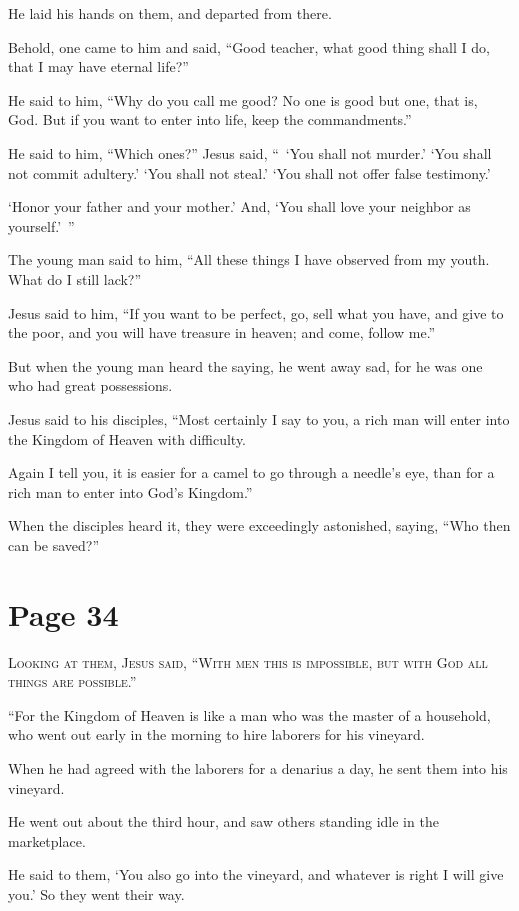 He laid his hands on them, and departed from there.

Behold, one came to him and said, “Good teacher, what good thing shall I do, that I may have eternal life?”

He said to him, “Why do you call me good? No one is good but one, that is, God. But if you want to enter into life, keep the commandments.”

He said to him, “Which ones?” Jesus said, “ ‘You shall not murder.’ ‘You shall not commit adultery.’ ‘You shall not steal.’ ‘You shall not offer false testimony.’

‘Honor your father and your mother.’ And, ‘You shall love your neighbor as yourself.’ ”

The young man said to him, “All these things I have observed from my youth. What do I still lack?”

Jesus said to him, “If you want to be perfect, go, sell what you have, and give to the poor, and you will have treasure in heaven; and come, follow me.”

But when the young man heard the saying, he went away sad, for he was one who had great possessions.

Jesus said to his disciples, “Most certainly I say to you, a rich man will enter into the Kingdom of Heaven with difficulty.

Again I tell you, it is easier for a camel to go through a needle’s eye, than for a rich man to enter into God’s Kingdom.”

When the disciples heard it, they were exceedingly astonished, saying, “Who then can be saved?”



\chapterornament
\section*{Page 34}

\lettrine{L}{ooking at them, Jesus said, “With men this is impossible, but with God all things are possible.”}

“For the Kingdom of Heaven is like a man who was the master of a household, who went out early in the morning to hire laborers for his vineyard.

When he had agreed with the laborers for a denarius a day, he sent them into his vineyard.

He went out about the third hour, and saw others standing idle in the marketplace.

He said to them, ‘You also go into the vineyard, and whatever is right I will give you.’ So they went their way.

